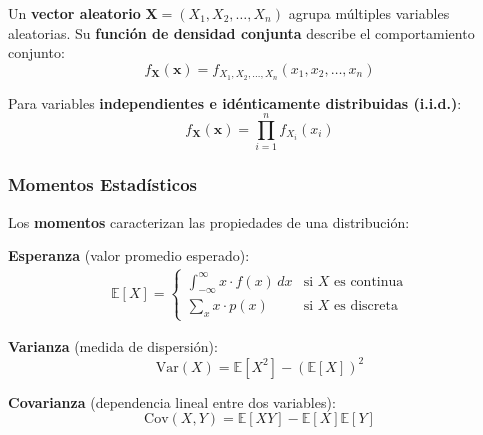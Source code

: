 \documentclass[
  11pt,
  letterpaper,
   addpoints,
  answers
  ]{exam}
\begin{document}
Un \textbf{vector aleatorio} $\mathbf{X} = (X_1, X_2, \ldots, X_n)$ agrupa múltiples variables aleatorias. Su \textbf{función de densidad conjunta} describe el comportamiento conjunto:
\begin{equation}
f_{\mathbf{X}}(\mathbf{x}) = f_{X_1,X_2,\ldots,X_n}(x_1, x_2, \ldots, x_n)
\end{equation}

Para variables \textbf{independientes e idénticamente distribuidas (i.i.d.)}:
\begin{equation}
f_{\mathbf{X}}(\mathbf{x}) = \prod_{i=1}^n f_{X_i}(x_i)
\end{equation}

\subsubsection*{Momentos Estadísticos}

Los \textbf{momentos} caracterizan las propiedades de una distribución:

\textbf{Esperanza} (valor promedio esperado):
\begin{align}
\mathbb{E}[X] = \begin{cases}
\int_{-\infty}^{\infty} x \cdot f(x) \, dx & \text{si } X \text{ es continua} \\
\sum_x x \cdot p(x) & \text{si } X \text{ es discreta}
\end{cases}
\end{align}

\textbf{Varianza} (medida de dispersión):
\begin{equation}
\text{Var}(X) = \mathbb{E}[X^2] - (\mathbb{E}[X])^2
\end{equation}

\textbf{Covarianza} (dependencia lineal entre dos variables):
\begin{equation}
\text{Cov}(X,Y) = \mathbb{E}[XY] - \mathbb{E}[X]\mathbb{E}[Y]
\end{equation}
\end{document}

